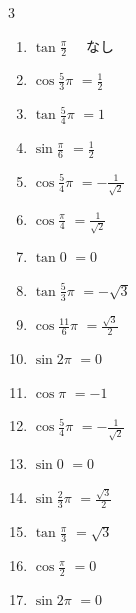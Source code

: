 \begin{multicols}{3}
\begin{enumerate}
  \item $\displaystyle \tan{\frac{\pi}{2}}$
        $\displaystyle \quad なし$

  \item $\displaystyle \cos{\frac{5}{3}\pi}$
        $\displaystyle =\frac{1}{2}$

  \item $\displaystyle \tan{\frac{5}{4}\pi}$
        $\displaystyle =1$

  \item $\displaystyle \sin{\frac{\pi}{6}}$
        $\displaystyle =\frac{1}{2}$

  \item $\displaystyle \cos{\frac{5}{4}\pi}$
        $\displaystyle =-\frac{1}{\sqrt{2}}$

  \item $\displaystyle \cos{\frac{\pi}{4}}$
        $\displaystyle =\frac{1}{\sqrt{2}}$

  \item $\displaystyle \tan{0}$
        $\displaystyle =0$

  \item $\displaystyle \tan{\frac{5}{3}\pi}$
        $\displaystyle =-\sqrt{3}$

  \item $\displaystyle \cos{\frac{11}{6}\pi}$
        $\displaystyle =\frac{\sqrt{3}}{2}$

  \item $\displaystyle \sin{2\pi}$
        $\displaystyle =0$

  \item $\displaystyle \cos{\pi}$
        $\displaystyle =-1$

  \item $\displaystyle \cos{\frac{5}{4}\pi}$
        $\displaystyle =-\frac{1}{\sqrt{2}}$

\columnbreak %

  \item $\displaystyle \sin{0}$
        $\displaystyle =0$

  \item $\displaystyle \sin{\frac{2}{3}\pi}$
        $\displaystyle =\frac{\sqrt{3}}{2}$

  \item $\displaystyle \tan{\frac{\pi}{3}}$
        $\displaystyle =\sqrt{3}$

  \item $\displaystyle \cos{\frac{\pi}{2}}$
        $\displaystyle =0$

  \item $\displaystyle \sin{2\pi}$
        $\displaystyle =0$


\end{enumerate}
\end{multicols}
